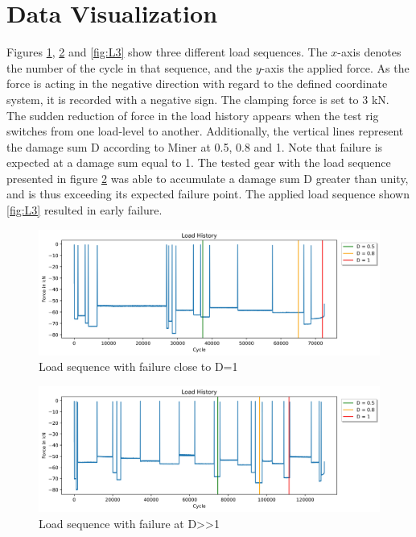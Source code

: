 \section{Data Visualization}\label{DV}
Figures \ref{fig:L1}, \ref{fig:L2} and \ref{fig:L3} show three different load sequences. The \(x\)-axis denotes the number of the cycle in that sequence, and the \(y\)-axis the applied force. As the force is acting in the negative direction with regard to the defined coordinate system, it is recorded with a negative sign. The clamping force is set to 3 kN. The sudden reduction of force in the load history appears when the test rig switches from one load-level to another. 
Additionally, the vertical lines represent the damage sum D according to Miner at 0.5, 0.8 and 1. Note that failure is expected at a damage sum equal to 1. The tested gear with the load sequence presented in figure \ref{fig:L2} was able to accumulate a damage sum D greater than unity, and is thus exceeding its expected failure point. The applied load sequence shown \ref{fig:L3} resulted in early failure.

\begin{figure}[H]
	\centering
	\includegraphics[width=1\linewidth]{IMGs/Load/L0.jpg}
	\caption{Load sequence with failure close to D=1}
	\label{fig:L1}
\end{figure}

\begin{figure}[H]
	\centering
	\includegraphics[width=1\linewidth]{IMGs/Load/L1.jpg}
	\caption{Load sequence with failure at D>>1}
	\label{fig:L2}
\end{figure}


